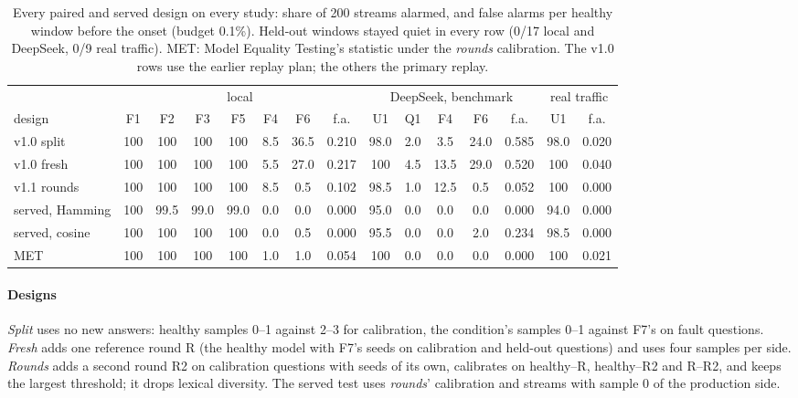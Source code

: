 \documentclass[11pt]{article}
\begin{document}
\begin{table}[t]
  \centering\small
  \caption{Every paired and served design on every study: share of 200 streams
  alarmed, and false alarms per healthy window before the onset (budget 0.1\%).
  Held-out windows stayed quiet in every row (0/17 local and DeepSeek, 0/9 real
  traffic). MET: Model Equality Testing's statistic under the \emph{rounds}
  calibration. The v1.0 rows use the earlier replay plan; the others the primary
  replay.}
  \label{tab:paired}
  \setlength{\tabcolsep}{3.4pt}
  \begin{tabular}{l|cccccc|c|cccc|c|c|c}
    \toprule
    & \multicolumn{7}{c|}{local} & \multicolumn{5}{c|}{DeepSeek, benchmark} & \multicolumn{2}{c}{real traffic} \\
    design & F1 & F2 & F3 & F5 & F4 & F6 & f.a. & U1 & Q1 & F4 & F6 & f.a. & U1 & f.a. \\
    \midrule
    v1.0 split & 100 & 100 & 100 & 100 & 8.5 & 36.5 & 0.210 & 98.0 & 2.0 & 3.5 & 24.0 & 0.585 & 98.0 & 0.020 \\
    v1.0 fresh & 100 & 100 & 100 & 100 & 5.5 & 27.0 & 0.217 & 100 & 4.5 & 13.5 & 29.0 & 0.520 & 100 & 0.040 \\
    v1.1 rounds & 100 & 100 & 100 & 100 & 8.5 & 0.5 & 0.102 & 98.5 & 1.0 & 12.5 & 0.5 & 0.052 & 100 & 0.000 \\
    served, Hamming & 100 & 99.5 & 99.0 & 99.0 & 0.0 & 0.0 & 0.000 & 95.0 & 0.0 & 0.0 & 0.0 & 0.000 & 94.0 & 0.000 \\
    served, cosine & 100 & 100 & 100 & 100 & 0.0 & 0.5 & 0.000 & 95.5 & 0.0 & 0.0 & 2.0 & 0.234 & 98.5 & 0.000 \\
    MET & 100 & 100 & 100 & 100 & 1.0 & 1.0 & 0.054 & 100 & 0.0 & 0.0 & 0.0 & 0.000 & 100 & 0.021 \\
    \bottomrule
  \end{tabular}
\end{table}

\paragraph{Designs} \emph{Split} uses no new answers: healthy samples 0--1 against
2--3 for calibration, the condition's samples 0--1 against F7's on fault
questions. \emph{Fresh} adds one reference round R (the healthy model with F7's
seeds on calibration and held-out questions) and uses four samples per side.
\emph{Rounds} adds a second round R2 on calibration questions with seeds of its
own, calibrates on healthy--R, healthy--R2 and R--R2, and keeps the largest
threshold; it drops lexical diversity. The served test uses \emph{rounds}'
calibration and streams with sample 0 of the production side.
\end{document}
